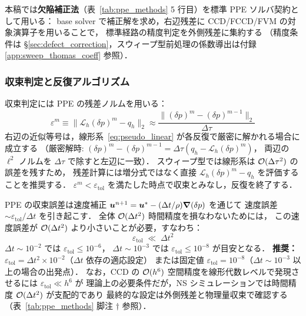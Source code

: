 本稿では\textbf{欠陥補正法}（表~\ref{tab:ppe_methods} 5 行目）を標準 PPE ソルバ契約として用いる：
base solver で補正解を求め，右辺残差に CCD/FCCD/FVM の対象演算子を用いることで，
標準経路の精度判定を外側残差に集約する
（精度条件は §\ref{sec:defect_correction}，スウィープ型前処理の係数導出は付録 \ref{app:sweep_thomas_coeff} 参照）．

\subsubsection{収束判定と反復アルゴリズム}
\label{sec:pseudo_convergence}

収束判定には PPE の残差ノルムを用いる：
\begin{equation}
  \varepsilon^m \equiv \bigl\|\mathcal{L}_h(\delta p)^m - q_h\bigr\|_2
  \approx \frac{\bigl\|(\delta p)^m - (\delta p)^{m-1}\bigr\|_2}{\Delta\tau}
  \label{eq:residual}
\end{equation}
右辺の近似等号は，線形系~\eqref{eq:pseudo_linear} が各反復で厳密に解かれる場合に成立する
（厳密解時: $(\delta p)^m - (\delta p)^{m-1} = \Delta\tau(q_h - \mathcal{L}_h(\delta p)^m)$，
両辺の $\ell^2$ ノルムを $\Delta\tau$ で除すと左辺に一致）．
スウィープ型では線形系は $\mathcal{O}(\Delta\tau^2)$ の誤差を残すため，
残差計算には増分式ではなく直接 $\mathcal{L}_h(\delta p)^m - q_h$ を評価することを推奨する．
$\varepsilon^m < \varepsilon_{\mathrm{tol}}$ を満たした時点で収束とみなし，反復を終了する．

\begin{tcolorbox}[resultbox, title={$\varepsilon_{\mathrm{tol}}$ 選択の実用基準}]
\label{result:etol_criterion}
PPE の収束誤差は速度補正 $\bm{u}^{n+1} = \bm{u}^* - (\Delta t/\rho)\bm{\nabla}(\delta p)$ を通じて
速度誤差 $\sim \varepsilon_\mathrm{tol}/\Delta t$ を引き起こす．
全体 $\mathcal{O}(\Delta t^2)$ 時間精度を損なわないためには，
この速度誤差が $\mathcal{O}(\Delta t^2)$ より小さいことが必要，すなわち：
\begin{equation}
  \varepsilon_\mathrm{tol} \;\ll\; \Delta t^2
  \label{eq:etol_physical}
\end{equation}
$\Delta t \sim 10^{-2}$ では $\varepsilon_\mathrm{tol} \leq 10^{-6}$，
$\Delta t \sim 10^{-3}$ では $\varepsilon_\mathrm{tol} \leq 10^{-8}$ が目安となる．
\textbf{推奨：} $\varepsilon_\mathrm{tol} = \Delta t^2 \times 10^{-2}$（$\Delta t$ 依存の適応設定）
または固定値 $\varepsilon_\mathrm{tol} = 10^{-8}$（$\Delta t \sim 10^{-3}$ 以上の場合の出発点）．
なお，CCD の $\mathcal{O}(h^6)$ 空間精度を線形代数レベルで発現させるには $\varepsilon_\mathrm{tol} \ll h^6$ が
理論上の必要条件だが，NS シミュレーションでは時間精度 $\mathcal{O}(\Delta t^2)$ が支配的であり
最終的な設定は外側残差と物理量収束で確認する（表~\ref{tab:ppe_methods} 脚注 $\dagger$ 参照）．
\end{tcolorbox}

